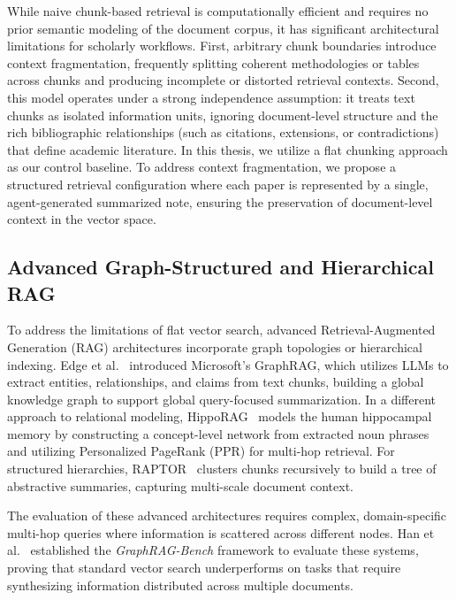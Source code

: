 \documentclass[runningheads]{llncs}
\begin{document}
While naive chunk-based retrieval is computationally efficient and requires no prior semantic modeling of the document corpus, it has significant architectural limitations for scholarly workflows. First, arbitrary chunk boundaries introduce context fragmentation, frequently splitting coherent methodologies or tables across chunks and producing incomplete or distorted retrieval contexts. Second, this model operates under a strong independence assumption: it treats text chunks as isolated information units, ignoring document-level structure and the rich bibliographic relationships (such as citations, extensions, or contradictions) that define academic literature. In this thesis, we utilize a flat chunking approach as our control baseline. To address context fragmentation, we propose a structured retrieval configuration where each paper is represented by a single, agent-generated summarized note, ensuring the preservation of document-level context in the vector space.

\subsection{Advanced Graph-Structured and Hierarchical RAG}
To address the limitations of flat vector search, advanced Retrieval-Augmented Generation (RAG) architectures incorporate graph topologies or hierarchical indexing. Edge et al.~\cite{edge2024local} introduced Microsoft's GraphRAG, which utilizes LLMs to extract entities, relationships, and claims from text chunks, building a global knowledge graph to support global query-focused summarization. In a different approach to relational modeling, HippoRAG~\cite{gutierrez2024hipporag} models the human hippocampal memory by constructing a concept-level network from extracted noun phrases and utilizing Personalized PageRank (PPR) for multi-hop retrieval. For structured hierarchies, RAPTOR~\cite{sarthi2024raptor} clusters chunks recursively to build a tree of abstractive summaries, capturing multi-scale document context.

The evaluation of these advanced architectures requires complex, domain-specific multi-hop queries where information is scattered across different nodes. Han et al.~\cite{han2025graphragbench} established the \textit{GraphRAG-Bench} framework to evaluate these systems, proving that standard vector search underperforms on tasks that require synthesizing information distributed across multiple documents.
\end{document}
